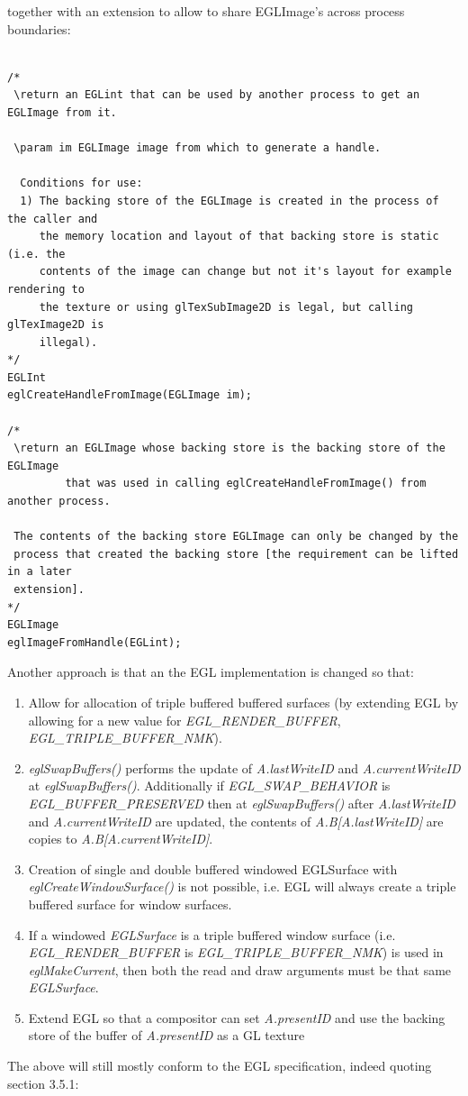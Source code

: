 \documentclass[a4paper,11pt]{article}
\begin{document}
\begin{indenter}{2cm}
\begin{indenter}{1cm}
\begin{verbatim}
\end{verbatim}
\end{indenter}

together with an extension to allow to share EGLImage's across process boundaries:

\begin{verbatim}

/*
 \return an EGLint that can be used by another process to get an EGLImage from it.

 \param im EGLImage image from which to generate a handle.

  Conditions for use:
  1) The backing store of the EGLImage is created in the process of the caller and
     the memory location and layout of that backing store is static (i.e. the 
     contents of the image can change but not it's layout for example rendering to 
     the texture or using glTexSubImage2D is legal, but calling glTexImage2D is 
     illegal).
*/
EGLInt
eglCreateHandleFromImage(EGLImage im);

/*
 \return an EGLImage whose backing store is the backing store of the EGLImage
         that was used in calling eglCreateHandleFromImage() from another process.
 
 The contents of the backing store EGLImage can only be changed by the
 process that created the backing store [the requirement can be lifted in a later
 extension].
*/
EGLImage
eglImageFromHandle(EGLint);
\end{verbatim}

Another approach is that an the EGL implementation is changed so that:
\begin{enumerate}
\item Allow for allocation of triple buffered buffered surfaces (by extending EGL by allowing for a new value for \textit{EGL\_RENDER\_BUFFER}, \textit{EGL\_TRIPLE\_BUFFER\_NMK}).
\item \textit{eglSwapBuffers()} performs the update of \textit{A.lastWriteID} and \textit{A.currentWriteID} at \textit{eglSwapBuffers()}. Additionally if \textit{EGL\_SWAP\_BEHAVIOR} is \textit{EGL\_BUFFER\_PRESERVED} then at \textit{eglSwapBuffers()} after \textit{A.lastWriteID} and \textit{A.currentWriteID} are updated, the contents of \textit{A.B[A.lastWriteID]} are copies to \textit{A.B[A.currentWriteID]}.
\item Creation of single and double buffered windowed EGLSurface with \textit{eglCreateWindowSurface()} is not possible, i.e. EGL will always create a triple buffered surface for window surfaces. 
\item If a windowed \textit{EGLSurface} is a triple buffered window surface (i.e. \textit{EGL\_RENDER\_BUFFER} is \textit{EGL\_TRIPLE\_BUFFER\_NMK}) is used in \textit{eglMakeCurrent}, then both the read and draw arguments must be that same \textit{EGLSurface}.
\item Extend EGL so that a compositor can set \textit{A.presentID} and use the backing store of the buffer of \textit{A.presentID} as a GL texture
\end{enumerate}
The above will still mostly conform to the EGL specification, indeed quoting section 3.5.1:


\end{indenter}
\end{document}
